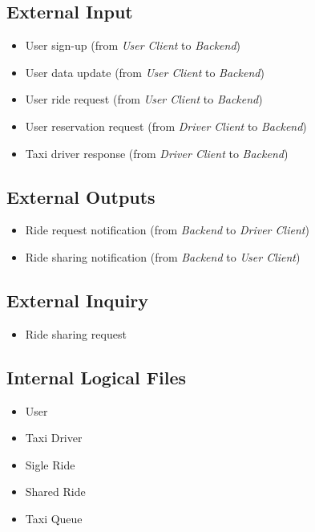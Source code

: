 
\subsection{External Input} %
\label{sub:external_inputs}
\begin{itemize}
	\item User sign-up (from \emph{User Client} to \emph{Backend})
	\item User data update (from \emph{User Client} to \emph{Backend})
	\item User ride request (from \emph{User Client} to \emph{Backend})
	\item User reservation request (from \emph{Driver Client} to \emph{Backend})
	\item Taxi driver response (from \emph{Driver Client} to \emph{Backend})
\end{itemize}

\subsection{External Outputs} %
\label{sub:external_outputs}
\begin{itemize}
	\item Ride request notification (from \emph{Backend} to \emph{Driver Client})
	\item Ride sharing notification (from \emph{Backend} to \emph{User Client})
\end{itemize}

\subsection{External Inquiry} %
\label{sub:external_inquiry}
\begin{itemize}
	\item Ride sharing request
\end{itemize}

\subsection{Internal Logical Files} %
\label{sub:internal_logical_files}
\begin{itemize}
	\item User
	\item Taxi Driver
	\item Sigle Ride
	\item Shared Ride
	\item Taxi Queue
\end{itemize}

